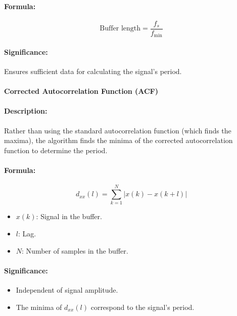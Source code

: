 \documentclass{ieeeaccess}
\begin{document}
\paragraph{Formula:}
\begin{equation}
\text{Buffer length} = \frac{f_s}{f_{\text{min}}}
\label{eq:buffer_length}
\end{equation}

\paragraph{Significance:}
Ensures sufficient data for calculating the signal's period.

\paragraph{Corrected Autocorrelation Function (ACF)}

\paragraph{Description:}
Rather than using the standard autocorrelation function (which finds the maxima), the algorithm finds the minima of the corrected autocorrelation function to determine the period.

\paragraph{Formula:}
\begin{equation}
d_{xx}(l) = \sum_{k=1}^{N} |x(k) - x(k+l)|
\label{eq:acf_obp}
\end{equation}

\begin{itemize}
    \item \( x(k) \): Signal in the buffer.
    \item \( l \): Lag.
    \item \( N \): Number of samples in the buffer.
\end{itemize}

\paragraph{Significance:}
\begin{itemize}
    \item Independent of signal amplitude.
    \item The minima of \( d_{xx}(l) \) correspond to the signal's period.
\end{itemize}
\end{document}
